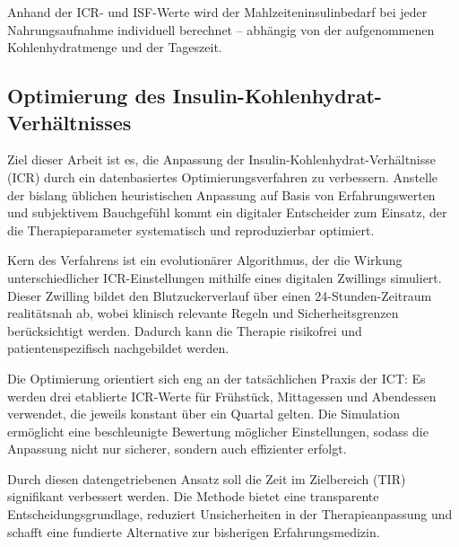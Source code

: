 Anhand der ICR- und ISF-Werte wird der Mahlzeiteninsulinbedarf bei jeder Nahrungsaufnahme individuell berechnet – abhängig von der aufgenommenen Kohlenhydratmenge und der Tageszeit.

\subsection{Optimierung des Insulin-Kohlenhydrat-Verhältnisses}

Ziel dieser Arbeit ist es, die Anpassung der Insulin-Kohlenhydrat-Verhältnisse (ICR) durch ein datenbasiertes Optimierungsverfahren zu verbessern. Anstelle der bislang üblichen heuristischen Anpassung auf Basis von Erfahrungswerten und subjektivem Bauchgefühl kommt ein digitaler Entscheider zum Einsatz, der die Therapieparameter systematisch und reproduzierbar optimiert.

Kern des Verfahrens ist ein evolutionärer Algorithmus, der die Wirkung unterschiedlicher ICR-Einstellungen mithilfe eines digitalen Zwillings simuliert. Dieser Zwilling bildet den Blutzuckerverlauf über einen 24-Stunden-Zeitraum realitätsnah ab, wobei klinisch relevante Regeln und Sicherheitsgrenzen berücksichtigt werden. Dadurch kann die Therapie risikofrei und patientenspezifisch nachgebildet werden.

Die Optimierung orientiert sich eng an der tatsächlichen Praxis der ICT: Es werden drei etablierte ICR-Werte für Frühstück, Mittagessen und Abendessen verwendet, die jeweils konstant über ein Quartal gelten. Die Simulation ermöglicht eine beschleunigte Bewertung möglicher Einstellungen, sodass die Anpassung nicht nur sicherer, sondern auch effizienter erfolgt.

Durch diesen datengetriebenen Ansatz soll die Zeit im Zielbereich (TIR) signifikant verbessert werden. Die Methode bietet eine transparente Entscheidungsgrundlage, reduziert Unsicherheiten in der Therapieanpassung und schafft eine fundierte Alternative zur bisherigen Erfahrungsmedizin.